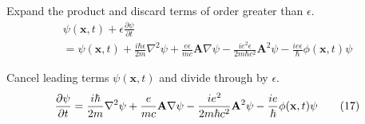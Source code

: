 \documentclass[12pt]{article}
\begin{document}
Expand the product and discard terms of order greater than $\epsilon$.
\begin{multline*}
\psi(\mathbf x,t)+\epsilon\frac{\partial\psi}{\partial t}
\\
{}=
\psi(\mathbf x,t)
+\frac{i\hbar\epsilon}{2m}\nabla^2\psi
+\frac{e\epsilon}{mc}\mathbf A\nabla\psi
-\frac{ie^2\epsilon}{2m\hbar c^2}\mathbf A^2\psi
-\frac{ie\epsilon}{\hbar}\phi(\mathbf x,t)\psi
\end{multline*}

Cancel leading terms $\psi(\mathbf x,t)$ and divide through by $\epsilon$.
\begin{equation*}
\frac{\partial\psi}{\partial t}
\\
{}=
\frac{i\hbar}{2m}\nabla^2\psi
+\frac{e}{mc}\mathbf A\nabla\psi
-\frac{ie^2}{2m\hbar c^2}\mathbf A^2\psi
-\frac{ie}{\hbar}\phi(\mathbf x,t)\psi
\tag{17}
\end{equation*}
\end{document}
